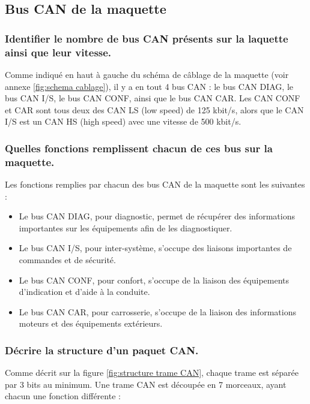 \documentclass{rapportECC}
\begin{document}
\subsection{Bus CAN de la maquette}

\subsubsection*{Identifier le nombre de bus CAN présents sur la laquette ainsi que leur vitesse.}

Comme indiqué en haut à gauche du schéma de câblage de la maquette (voir annexe \ref{fig:schema cablage}), il y a en tout 4 bus CAN : le bus CAN DIAG, le bus CAN I/S, le bus CAN CONF, ainsi que le bus CAN CAR. Les CAN CONF et CAR sont tous deux des CAN LS (low speed) de 125 kbit/s, alors que le CAN I/S est un CAN HS (high speed) avec une vitesse de 500 kbit/s.

\subsubsection*{Quelles fonctions remplissent chacun de ces bus sur la maquette.}

Les fonctions remplies par chacun des bus CAN de la maquette sont les suivantes :

\begin{itemize}
    \item Le bus CAN DIAG, pour diagnostic, permet de récupérer des informations importantes sur les équipements afin de les diagnostiquer.
    \item Le bus CAN I/S, pour inter-système, s'occupe des liaisons importantes de commandes et de sécurité.
    \item Le bus CAN CONF, pour confort, s'occupe de la liaison des équipements d'indication et d'aide à la conduite.
    \item Le bus CAN CAR, pour carrosserie, s'occupe de la liaison des informations moteurs et des équipements extérieurs.
\end{itemize}

\subsubsection*{Décrire la structure d'un paquet CAN.}

Comme décrit sur la figure \ref{fig:structure trame CAN}, chaque trame est séparée par 3 bits au minimum. Une trame CAN est découpée en 7 morceaux, ayant chacun une fonction différente :
\end{document}
